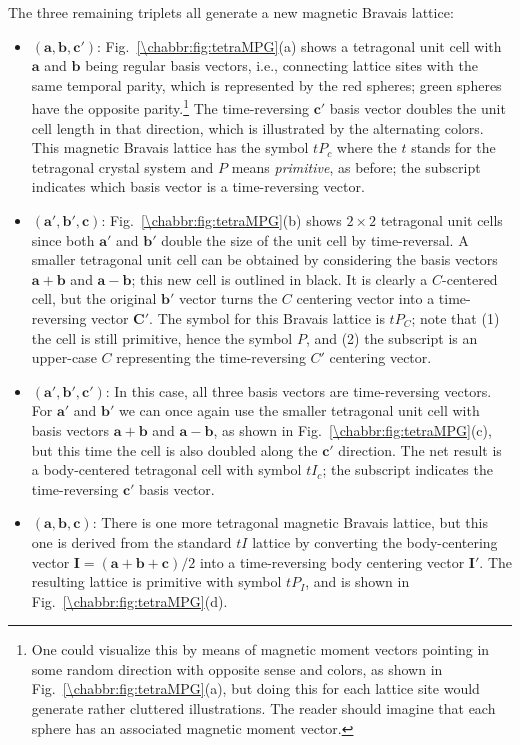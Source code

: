 The three remaining triplets all generate a new magnetic Bravais lattice:
\begin{itemize}
\item $(\mathbf{a},\mathbf{b},\mathbf{c}')$: Fig.~\ref{\chabbr:fig:tetraMPG}(a) shows a tetragonal unit cell with $\mathbf{a}$ and $\mathbf{b}$ being regular basis vectors, i.e., connecting lattice sites with the same temporal parity, which is represented by the red spheres; green spheres have the opposite parity.\footnote{One could visualize this by means of magnetic moment vectors pointing in some random direction with opposite sense and colors, as shown in Fig.~\ref{\chabbr:fig:tetraMPG}(a), but doing this for each lattice site would generate rather cluttered illustrations. The reader should imagine that each sphere has an associated magnetic moment vector.}  The time-reversing $\mathbf{c}'$ basis vector doubles the unit cell length in that direction, which is illustrated by the alternating colors. This magnetic Bravais lattice has the symbol $tP_c$ where the $t$ stands for the tetragonal crystal system and $P$ means \textit{primitive}, as before; the subscript indicates which basis vector is a time-reversing vector.  
\item $(\mathbf{a}',\mathbf{b}',\mathbf{c})$: Fig.~\ref{\chabbr:fig:tetraMPG}(b) shows $2\times 2$ tetragonal unit cells since both $\mathbf{a}'$ and $\mathbf{b}'$ double the size of the unit cell by time-reversal. A smaller tetragonal unit cell can be obtained by considering the basis vectors $\mathbf{a}+\mathbf{b}$ and $\mathbf{a}-\mathbf{b}$; this new cell is outlined in black. It is clearly a $C$-centered cell, but the original $\mathbf{b}'$ vector turns the $C$ centering vector into a time-reversing vector $\mathbf{C}'$. The symbol for this Bravais lattice is $tP_C$; note that (1) the cell is still primitive, hence the symbol $P$, and (2) the subscript is an upper-case $C$ representing the time-reversing $C'$ centering vector.
\item $(\mathbf{a}',\mathbf{b}',\mathbf{c}')$: In this case, all three basis vectors are time-reversing vectors.  For $\mathbf{a}'$ and $\mathbf{b}'$ we can once again use the smaller tetragonal unit cell with basis vectors $\mathbf{a}+\mathbf{b}$ and $\mathbf{a}-\mathbf{b}$, as shown in Fig.~\ref{\chabbr:fig:tetraMPG}(c), but this time the cell is also doubled along the $\mathbf{c}'$ direction. The net result is a body-centered tetragonal cell with symbol $tI_c$; the subscript indicates the time-reversing $\mathbf{c}'$ basis vector.
\item $(\mathbf{a},\mathbf{b},\mathbf{c})$: There is one more tetragonal magnetic Bravais lattice, but this one is derived from the standard $tI$ lattice by converting the body-centering vector $\mathbf{I}=(\mathbf{a}+\mathbf{b}+\mathbf{c})/2$ into a time-reversing body centering vector $\mathbf{I}'$. The resulting lattice is primitive with symbol $tP_I$, and is shown in Fig.~\ref{\chabbr:fig:tetraMPG}(d).
\end{itemize}

